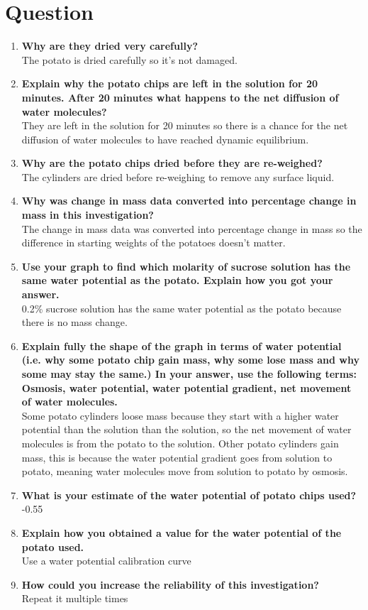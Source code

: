 \documentclass{thomasClass}
\begin{document}
\section{Question}
\begin{enumerate}
    \item \textbf{Why are they dried very carefully?} \\ The potato is dried carefully so it's not damaged.
    \item \textbf{Explain why the potato chips are left in the solution for 20 minutes. After 20 minutes what happens to the net diffusion of water molecules?} \\ They are left in the solution for 20 minutes so there is a chance for the net diffusion of water molecules to have reached dynamic equilibrium.
    \item \textbf{Why are the potato chips dried before they are re-weighed?} \\ The cylinders are dried before re-weighing to remove any surface liquid.
    \item \textbf{Why was change in mass data converted into percentage change in mass in this investigation?} \\ The change in mass data was converted into percentage change in mass so the difference in starting weights of the potatoes doesn't matter.
    \item \textbf{Use your graph to find which molarity of sucrose solution has the same water potential as the potato. Explain how you got your answer.} \\ 0.2\% sucrose solution has the same water potential as the potato because there is no mass change.
    \item \textbf{Explain fully the shape of the graph in terms of water potential (i.e. why some potato chip gain mass, why some lose mass and why some may stay the same.)  In your answer, use the following terms: Osmosis, water potential, water potential gradient, net movement of water molecules.} \\ Some potato cylinders loose mass because they start with a higher water potential than the solution than the solution, so the net movement of water molecules is from the potato to the solution. Other potato cylinders gain mass, this is because the water potential gradient goes from solution to potato, meaning water molecules move from solution to potato by osmosis.
    \item \textbf{What is your estimate of the water potential of potato chips used?} \\ -0.55
    \item \textbf{Explain how you obtained a value for the water potential of the potato used.} \\ Use a water potential calibration curve
    \item \textbf{How could you increase the reliability of this investigation?} \\ Repeat it multiple times 
\end{enumerate}
\end{document}
